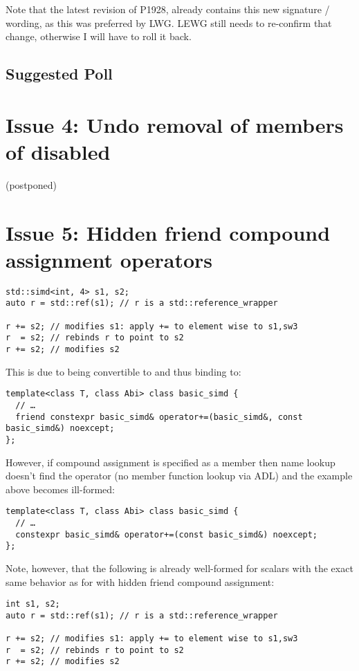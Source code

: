 Note that the latest revision of P1928, already contains this new signature / wording, as this was
preferred by LWG.
LEWG still needs to re-confirm that change, otherwise I will have to roll it back.

\subsection{Suggested Poll}


\section{Issue 4: Undo removal of members of disabled \simd{}}

(postponed)

\pagebreak
\section{Issue 5: Hidden friend compound assignment operators}

\begin{lstlisting}
std::simd<int, 4> s1, s2;
auto r = std::ref(s1); // r is a std::reference_wrapper

r += s2; // modifies s1: apply += to element wise to s1,sw3
r  = s2; // rebinds r to point to s2
r += s2; // modifies s2
\end{lstlisting}

This is due to  being convertible to  and thus binding to:
\smallskip\begin{lstlisting}
template<class T, class Abi> class basic_simd {
  // …
  friend constexpr basic_simd& operator+=(basic_simd&, const basic_simd&) noexcept;
};
\end{lstlisting}

However, if compound assignment is specified as a member then name lookup doesn't find the operator
(no member function lookup via ADL) and the example above becomes ill-formed:
\smallskip\begin{lstlisting}
template<class T, class Abi> class basic_simd {
  // …
  constexpr basic_simd& operator+=(const basic_simd&) noexcept;
};
\end{lstlisting}

Note, however, that the following is already well-formed for scalars with the exact same behavior as
for  with hidden friend compound assignment:
\smallskip\begin{lstlisting}
int s1, s2;
auto r = std::ref(s1); // r is a std::reference_wrapper

r += s2; // modifies s1: apply += to element wise to s1,sw3
r  = s2; // rebinds r to point to s2
r += s2; // modifies s2
\end{lstlisting}

